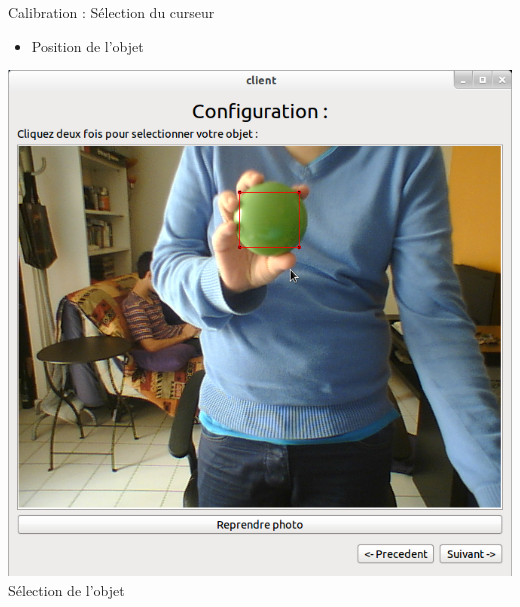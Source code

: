 \documentclass{beamer}
\begin{document}
            \begin{frame}{Calibration : Sélection du curseur}
                  \begin{itemize}
                        \item{Position de l'objet}
                  \end{itemize}
                  \begin{center}
                        \includegraphics[scale=0.25]{Capture1.png}\\
                        Sélection de l'objet
                  \end{center}
            
            \end{frame}
\end{document}
